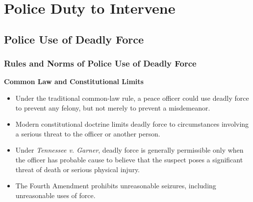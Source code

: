 \documentclass[11pt]{tex/lawoutline}
\begin{document}



\section{Police Duty to Intervene}

\subsection{Police Use of Deadly Force}

\subsubsection{Rules and Norms of Police Use of Deadly Force}

\textbf{Common Law and Constitutional Limits}{
\begin{itemize}
    \item Under the traditional common-law rule, a peace officer could use deadly force to prevent any felony, but not merely to prevent a misdemeanor.
    \item Modern constitutional doctrine limits deadly force to circumstances involving a serious threat to the officer or another person.
    \item Under \textit{Tennessee v. Garner}, deadly force is generally permissible only when the officer has probable cause to believe that the suspect poses a significant threat of death or serious physical injury.
    \item The Fourth Amendment prohibits unreasonable seizures, including unreasonable uses of force.
\end{itemize}
}
\end{document}
